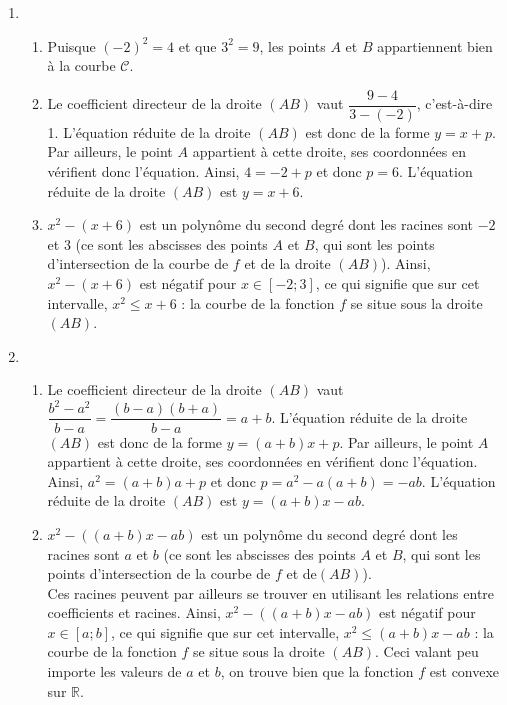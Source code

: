 \documentclass[11pt,fleqn, openany]{book} %
\begin{document}
\begin{solution}\hspace{0pt}
\begin{enumerate}\item \begin{enumerate}\item Puisque \((-2)^2=4\) et que \(3^2=9\), les points \(A\) et \(B\) appartiennent bien à la courbe \(\mathcal{C}\).
	\item Le coefficient directeur de la droite \((AB)\) vaut \(\dfrac{9-4}{3-(-2)}\), c'est-à-dire 1. L'équation réduite de la droite \((AB)\) est donc de la forme \(y=x+p\). Par ailleurs, le point \(A\) appartient à cette droite, ses coordonnées en vérifient donc l'équation. Ainsi, \(4=-2+p\) et donc \(p=6\). L'équation réduite de la droite \((AB)\) est \(y=x+6\).
	\item \(x^2-(x+6)\) est un polynôme du second degré dont les racines sont \(-2\) et \(3\) (ce sont les abscisses des points \(A\) et \(B\), qui sont les points d'intersection de la courbe de \(f\) et de la droite \((AB)\)). Ainsi, \(x^2-(x+6)\) est négatif pour \(x \in [-2;3]\), ce qui signifie que sur cet intervalle, \(x^2 \leqslant x+6\) : la courbe de la fonction \(f\) se situe sous la droite \((AB)\).\end{enumerate}
	
	\item \begin{enumerate}\item Le coefficient directeur de la droite \((AB)\) vaut \(\dfrac{b^2-a^2}{b-a}=\dfrac{(b-a)(b+a)}{b-a}=a+b\). L'équation réduite de la droite \((AB)\) est donc de la forme \(y=(a+b)x+p\). Par ailleurs, le point \(A\) appartient à cette droite, ses coordonnées en vérifient donc l'équation. Ainsi, \(a^2=(a+b)a+p\) et donc \(p=a^2-a(a+b)=-ab\). L'équation réduite de la droite \((AB)\) est \(y=(a+b)x-ab\).
	\item \(x^2-((a+b)x-ab)\) est un polynôme du second degré dont les racines sont \(a\) et \(b\) (ce sont les abscisses des points \(A\) et \(B\), qui sont les points d'intersection de la courbe de \(f\) et de\((AB)\)). \\ Ces racines peuvent par ailleurs se trouver en utilisant les relations entre coefficients et racines. Ainsi, \(x^2-((a+b)x-ab)\) est négatif pour \(x \in [a;b]\), ce qui signifie que sur cet intervalle, \(x^2 \leqslant (a+b)x-ab\) : la courbe de la fonction \(f\) se situe sous la droite \((AB)\). Ceci valant peu importe les valeurs de \(a\) et \(b\), on trouve bien que la fonction \(f\) est convexe sur \(\mathbb{R}\).\end{enumerate}\end{enumerate}
\end{solution}
\end{document}
